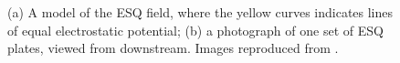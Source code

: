 \begin{figure}[t!]
\centering{}
\caption{(a) A model of the ESQ field, where the yellow curves indicates lines of equal electrostatic potential; (b) a photograph of one set of ESQ plates, viewed from downstream. Images reproduced from \cite{TDR}.}
\label{fig:Quads}
\end{figure} 

